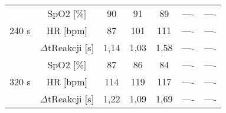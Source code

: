 \begin{table}[ht]
\begin{tabular}{|c|c|c|c|c|c|c|}
        \multirow{3}{*}{240 s} & SpO2 $[$\%$]$ & 90  &  91 &  89 & ----  & ----  \\ \cline{2-7} 
                              & HR $[$bpm$]$     & 87  & 101  & 111  & ----  & ---- \\ \cline{2-7} 
                              & $\Delta$tReakcji $[$s$]$   & 1,14  & 1,03  & 1,58  & ----  & ----  \\ \hline
        \multirow{3}{*}{320 s} & SpO2 $[$\%$]$ & 87  &  86 &  84 & ----  & ----  \\ \cline{2-7} 
                              & HR $[$bpm$]$     & 114  & 119  & 117  & ----  &  ---- \\ \cline{2-7} 
                              & $\Delta$tReakcji $[$s$]$   & 1,22  & 1,09  & 1,69  & ----  & ----  \\ \hline
        \end{tabular}
    \end{table}

\newpage
